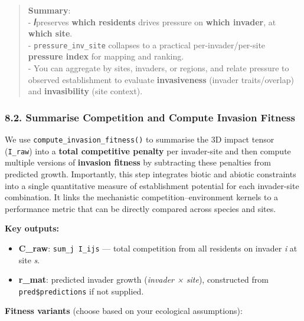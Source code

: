 \documentclass[
]{article}
\providecommand{\tightlist}{%
  \setlength{\itemsep}{0pt}\setlength{\parskip}{0pt}}
\begin{document}
\begin{quote}
\textbf{Summary}:\\
- \textbf{𝐼}preserves \textbf{which residents} drives pressure on
\textbf{which invader}, at \textbf{which site}.\\
- \texttt{pressure\_inv\_site} collapses to a practical
per-invader/per-site \textbf{pressure index} for mapping and ranking.\\
- You can aggregate by sites, invaders, or regions, and relate pressure
to observed establishment to evaluate \textbf{invasiveness} (invader
traits/overlap) and \textbf{invasibility} (site context).
\end{quote}

\hypertarget{summarise-competition-and-compute-invasion-fitness}{%
\subsubsection{8.2. Summarise Competition and Compute Invasion
Fitness}\label{summarise-competition-and-compute-invasion-fitness}}

We use \texttt{compute\_invasion\_fitness()} to summarise the 3D impact
tensor (\texttt{I\_raw}) into a \textbf{total competitive penalty} per
invader-site and then compute multiple versions of \textbf{invasion
fitness} by subtracting these penalties from predicted growth.
Importantly, this step integrates biotic and abiotic constraints into a
single quantitative measure of establishment potential for each
invader-site combination. It links the mechanistic
competition--environment kernels to a performance metric that can be
directly compared across species and sites.

\textbf{Key outputs:}

\begin{itemize}
\tightlist
\item
  \textbf{C\_raw}: \texttt{sum\_j\ I\_ijs} --- total competition from
  all residents on invader \emph{i} at site \emph{s}.\\
\item
  \textbf{r\_mat}: predicted invader growth (\emph{invader × site}),
  constructed from \texttt{pred\$predictions} if not supplied.
\end{itemize}

\textbf{Fitness variants} (choose based on your ecological assumptions):
\end{document}
